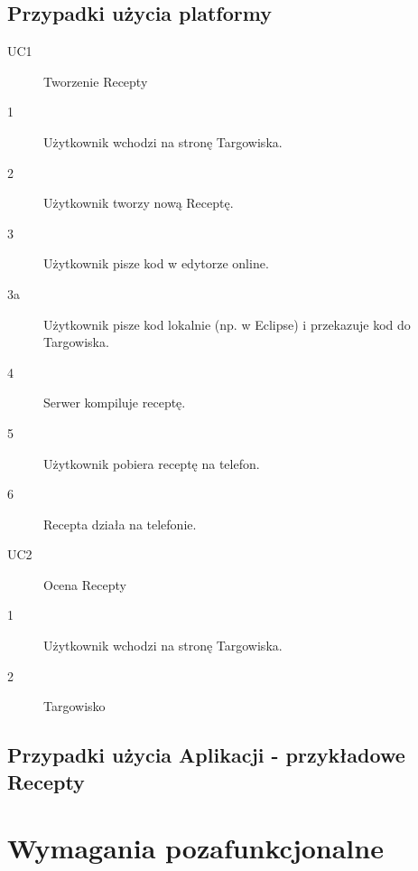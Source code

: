 \documentclass[11pt,a4paper,polish,thesis]{dcsbook}
\begin{document}
\subsection{Przypadki użycia platformy} %
\begin{description}
\item[UC1] Tworzenie Recepty
\item[1] Użytkownik wchodzi na stronę Targowiska.
\item[2]Użytkownik tworzy nową Receptę.
\item[3]Użytkownik pisze kod w edytorze online.
\item[3a]Użytkownik pisze kod lokalnie (np. w Eclipse) i przekazuje kod do Targowiska.
\item[4]Serwer kompiluje receptę.
\item[5]Użytkownik pobiera receptę na telefon.
\item[6]Recepta działa na telefonie.

\item[UC2] Ocena Recepty
\item[1] Użytkownik wchodzi na stronę Targowiska.
\item[2] Targowisko  


\end{description}
\subsection{Przypadki użycia Aplikacji - przykładowe Recepty}
\section{Wymagania pozafunkcjonalne}
\end{document}
